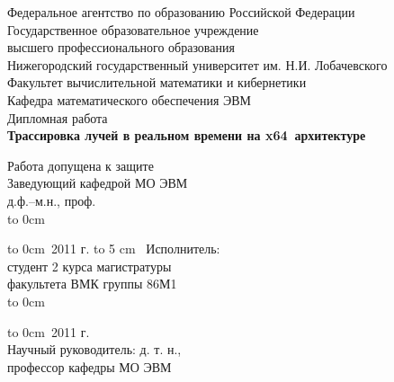 \documentclass[12pt, a4paper]{article}
\begin{document}
\begin{titlepage}
\begin{center}
{\large Федеральное агентство по образованию Российской Федерации\\
\vspace{0.25em}
Государственное образовательное учреждение\\высшего профессионального образования\\Нижегородский государственный университет им. Н.И. Лобачевского\\
\vspace{0.25em}
Факультет вычислительной математики и кибернетики\\
\vspace{0.25em}
Кафедра математического обеспечения ЭВМ\\
\vspace{3em}
Дипломная работа\\
}
\vspace{1em}
{\bf \huge
	\textsf{ Трассировка лучей в реальном времени на x64~архитектуре \\ } 
}
\end{center}
\vspace{0.5cm}
\begin{multicols}{2}
\large 
\noindent 
Работа допущена к защите \\
Заведующий кафедрой МО ЭВМ \\
д.ф.--м.н., проф. \\

\vspace*{1em}
{ \noindent
\hspace*{1.5cm}\hbox to 0cm{}\hspace{-1.5cm}{\hrulefill\ Стронгин Р. Г. }
}

\vspace*{1.0em}
{ \noindent
\hbox to 0cm{\raisebox{0.25em}{<<\ \ \ \ \ \  >>}}{\hrulefill\ 2011 г. }
}
\vbox to 5 cm{\ }
Исполнитель: \\
студент 2 курса магистратуры \\
факультета ВМК группы 86М1 \\

\vspace*{1em}
{ \noindent
\hspace*{1.5cm}\hbox to 0cm{}\hspace{-1.5cm}{\hrulefill\ Морозов А. С. }
}

\vspace*{1.0em}
{ \noindent
\hbox to 0cm{\raisebox{0.25em}{<<\ \ \ \ \ \  >>}}{\hrulefill\ 2011 г. }
}
\\
Научный руководитель: д. т. н., \\
профессор кафедры МО ЭВМ \\


\end{multicols}
\end{titlepage}
\end{document}
